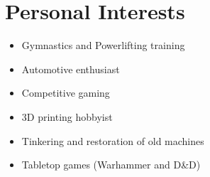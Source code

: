 \documentclass[10pt]{article} %
\begin{document}
\medskip %


\section{Personal Interests}


\setlength{} %

\begin{paracol}{2} %

	\begin{itemize}\itemsep0em 
		\item Gymnastics and Powerlifting training
		\item Automotive enthusiast
		\item Competitive gaming	
	\end{itemize}
		
	
	\switchcolumn %
	

	\begin{itemize}\itemsep0em 
		\item 3D printing hobbyist
		\item Tinkering and restoration of old machines
		\item Tabletop games (Warhammer and D\&D)
	\end{itemize}

	
\end{paracol}

\medskip %

\end{document}

